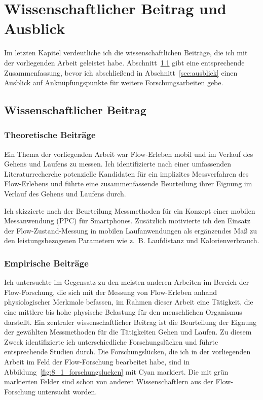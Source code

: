 \chapter{Wissenschaftlicher Beitrag und Ausblick} 
\label{cha:wissenschaftlicher_beitrag_und_ausblick}
Im letzten Kapitel verdeutliche ich die wissenschaftlichen Beiträge, die ich mit der vorliegenden Arbeit geleistet habe. Abschnitt~\ref{sec:wissenschaftlicher_beitrag} gibt eine entsprechende Zusammenfassung, bevor ich abschließend in Abschnitt~\ref{sec:ausblick} einen Ausblick auf Anknüpfungspunkte für weitere Forschungsarbeiten gebe.

\section{Wissenschaftlicher Beitrag}
\label{sec:wissenschaftlicher_beitrag} 
\subsection{Theoretische Beiträge}
Ein Thema der vorliegenden Arbeit war Flow-Erleben mobil und im Verlauf des Gehens und Laufens zu messen. Ich identifizierte nach einer umfassenden Literaturrecherche potenzielle Kandidaten für ein implizites Messverfahren des Flow-Erlebens und führte eine zusammenfassende Beurteilung ihrer Eignung im Verlauf des Gehens und Laufens durch. 

Ich skizzierte nach der Beurteilung Messmethoden für ein Konzept einer mobilen Messanwendung (\ac{PPC}) für Smartphones. Zusätzlich motivierte ich den Einsatz der Flow-Zustand-Messung in mobilen Laufanwendungen als ergänzendes Maß zu den leistungsbezogenen Parametern wie z.~B. Laufdistanz und Kalorienverbrauch.

\subsection{Empirische Beiträge} 
Ich untersuchte im Gegensatz zu den meisten anderen Arbeiten im Bereich der Flow-Forschung, die sich mit der Messung von Flow-Erleben anhand physiologischer Merkmale befassen, im Rahmen dieser Arbeit eine Tätigkeit, die eine mittlere bis hohe physische Belastung für den menschlichen Organismus darstellt. Ein zentraler wissenschaftlicher Beitrag ist die Beurteilung der Eignung der gewählten Messmethoden für die Tätigkeiten Gehen und Laufen. Zu diesem Zweck identifizierte ich unterschiedliche Forschungslücken und führte entsprechende Studien durch. Die Forschungslücken, die ich in der vorliegenden Arbeit im Feld der Flow-Forschung bearbeitet habe, sind in Abbildung~\ref{fig:8_1_forschungslueken} mit Cyan markiert. Die mit grün markierten Felder sind schon von anderen Wissenschaftlern aus der Flow-Forschung untersucht worden. 

